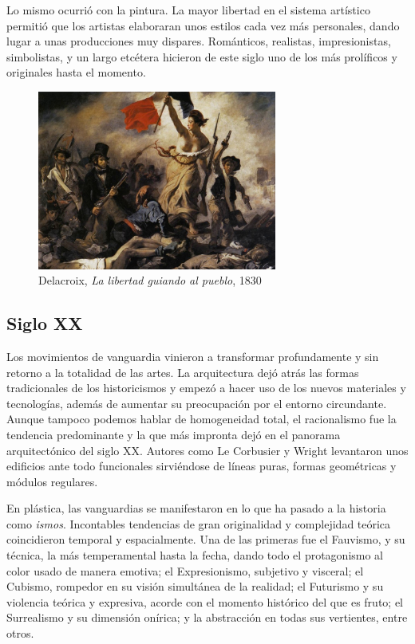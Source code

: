 Lo mismo ocurrió con la pintura. La mayor libertad en el sistema artístico permitió que los artistas elaboraran unos estilos cada vez más personales, dando lugar a unas producciones muy dispares. Románticos, realistas, impresionistas, simbolistas, y un largo etcétera hicieron de este siglo uno de los más prolíficos y originales hasta el momento.

\begin{figure}[!h]
    \begin{center}
        \includegraphics[width=0.7\textwidth]{imagenes/2/libertad-guiando.jpg}
        \caption{Delacroix, \textit{La libertad guiando al pueblo}, 1830}
        \label{fig:libertdad-guiando-pueblo}
    \end{center}
\end{figure}

\subsection{Siglo XX}

Los movimientos de vanguardia vinieron a transformar profundamente y sin retorno a la totalidad de las artes. La arquitectura dejó atrás las formas tradicionales de los historicismos y empezó a hacer uso de los nuevos materiales y tecnologías, además de aumentar su preocupación por el entorno circundante. Aunque tampoco podemos hablar de homogeneidad total, el racionalismo fue la tendencia predominante y la que más impronta dejó en el panorama arquitectónico del siglo XX. Autores como Le Corbusier y Wright levantaron unos edificios ante todo funcionales sirviéndose de líneas puras, formas geométricas y módulos regulares.

En plástica, las vanguardias se manifestaron en lo que ha pasado a la historia como \textit{ismos}. Incontables tendencias de gran originalidad y complejidad teórica coincidieron temporal y espacialmente. Una de las primeras fue el Fauvismo, y su técnica, la más temperamental hasta la fecha, dando todo el protagonismo al color usado de manera emotiva; el Expresionismo, subjetivo y visceral; el Cubismo, rompedor en su visión simultánea de la realidad; el Futurismo y su violencia teórica y expresiva, acorde con el momento histórico del que es fruto; el Surrealismo y su dimensión onírica; y la abstracción en todas sus vertientes, entre otros.


